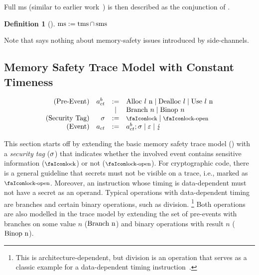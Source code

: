 \documentclass[dvipsnames,conference]{IEEEtran}
\theoremstyle{definition}
\newtheorem{definition}{Definition}[section]
\begin{document}
Full \gls*{ms} (similar to earlier work~\cite{nagarakatte2009soft,nagarakatte2010cets,jim2002cyclone,necula2005ccured,michael2023mswasm}) is then described as the conjunction of .

\begin{definition}[]\label{def:trace:msdef}
  $
  \operatorname{ms}:=\operatorname{tms} \cap \operatorname{sms}
  $
\end{definition}

Note that  says nothing about memory-safety issues introduced by side-channels.

\subsection{Memory Safety Trace Model with Constant Timeness}

\[
  \begin{array}{rrcl}
    (\text{Pre-Event}) & \event[^b_{ct}] &:=& \ev{Alloc \loc\ n} \mid \ev{Dealloc \loc} \mid \ev{Use \loc\ n}\\
                       &&\mid& \ev{Branch\ }n \mid \ev{Binop\ }n\\
    (\text{Security Tag}) & \securitytag &:=& \lock \mid \unlock\\ 
    (\text{Event}) & \event[_{ct}] &:=& \event[^b_{ct}];\securitytag \mid \emptyevent \mid \lightning \\ 
  \end{array}
\]

This section starts off by extending the basic memory safety trace model () with a {\em security tag} ($\sigma$) that indicates whether the involved event contains sensitive information ($\lock$) or not ($\unlock$).
For cryptographic code, there is a general guideline that secrets must not be visible on a trace, i.e., marked as $\unlock$.
Moreover, an instruction whose timing is data-dependent must not have a secret as an operand.
Typical operations with data-dependent timing are branches and certain binary operations, such as division. 
\footnote{
	This is architecture-dependent, but division is an operation that serves as a classic example for a data-dependent timing instruction~\cite[p.~755]{arm-refman}.
}
Both operations are also modelled in the trace model by extending the set of pre-events with branches on some value $n$ ($\text{Branch\ n}$) and binary operations with result $n$ ($\text{Binop\ n}$).
\end{document}
